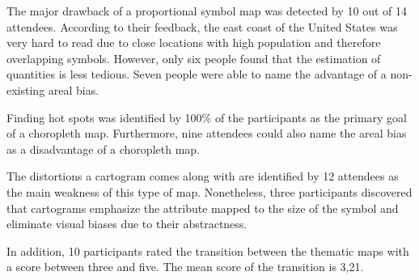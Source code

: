 The major drawback of a proportional symbol map was detected by 10 out of 14 attendees. According to their feedback, the east coast of the United States was very hard to read due to close locations with high population and therefore overlapping symbols. However, only six people found that the estimation of quantities is less tedious. Seven people were able to name the advantage of a non-existing areal bias.

Finding hot spots was identified by 100\% of the participants as the primary goal of a choropleth map. Furthermore, nine attendees could also name the areal bias as a disadvantage of a choropleth map.

The distortions a cartogram comes along with are identified by 12 attendees as the main weakness of this type of map. Nonetheless, three participants discovered that cartograms emphasize the attribute mapped to the size of the symbol and eliminate visual biases due to their abstractness.

In addition, 10 participants rated the transition between the thematic maps with a score between three and five. The mean score of the transition is 3,21.